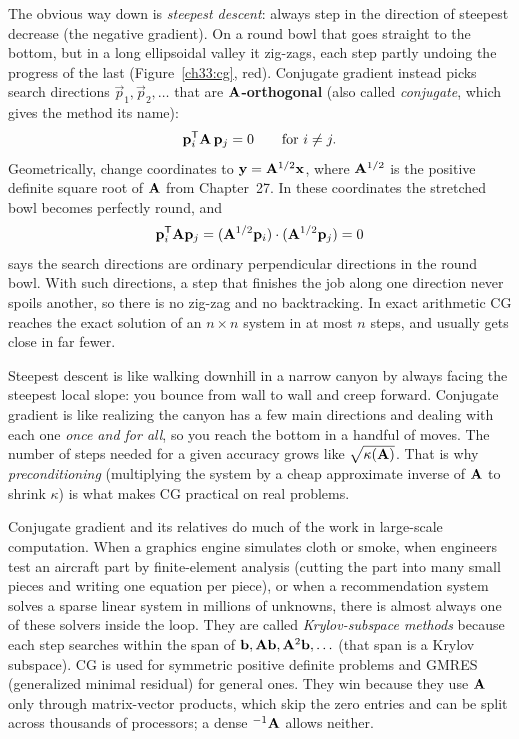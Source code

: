 The obvious way down is \emph{steepest descent}: always step in the direction of
steepest decrease (the negative gradient). On a round bowl that goes straight to the
bottom, but in a long ellipsoidal valley it zig-zags, each step partly undoing the
progress of the last (Figure~\ref{ch33:cg}, red). Conjugate gradient instead picks
search directions $\vec{p}_1,\vec{p}_2,\ldots$ that are \textbf{$\mathbf{A}$-orthogonal}
(also called \emph{conjugate}, which gives the method its name):
\[
  \mathbf{p}_i^{\mathsf{T}}\mathbf{A}\,\mathbf{p}_j=0 \qquad\text{for } i\ne j.
\]
Geometrically, change coordinates to $\mathbf{y}=\mathbf{A}^{1/2}\mathbf{x}$, where
$\mathbf{A}^{1/2}$ is the positive definite square root of $\mathbf{A}$ from Chapter~27. In
these coordinates the stretched bowl becomes perfectly round, and
\[
  \mathbf{p}_i^{\mathsf{T}}\mathbf{A}\mathbf{p}_j=(\mathbf{A}^{1/2}\mathbf{p}_i)\cdot(\mathbf{A}^{1/2}\mathbf{p}_j)=0
\]
says the search directions are ordinary perpendicular directions in the round bowl.
With such directions, a step that finishes the job along one direction never spoils
another, so there is no zig-zag and no backtracking. In exact arithmetic CG reaches the
exact solution of an $n\times n$ system in at most $n$ steps, and usually gets close in
far fewer.

\begin{intuitionbox}
Steepest descent is like walking downhill in a narrow canyon by always facing the
steepest local slope: you bounce from wall to wall and creep forward. Conjugate gradient
is like realizing the canyon has a few main directions and dealing with each one
\emph{once and for all}, so you reach the bottom in a handful of moves. The number of
steps needed for a given accuracy grows like $\sqrt{\kappa(\mathbf{A})}$. That is why
\emph{preconditioning} (multiplying the system by a cheap approximate inverse of
$\mathbf{A}$ to shrink $\kappa$) is what makes CG practical on real problems.
\end{intuitionbox}

\begin{applicationbox}
Conjugate gradient and its relatives do much of the work in large-scale computation.
When a graphics engine simulates cloth or smoke, when engineers test an aircraft part by
finite-element analysis (cutting the part into many small pieces and writing one
equation per piece), or when a recommendation system solves a sparse linear system in
millions of unknowns, there is almost always one of these solvers inside the loop. They
are called \emph{Krylov-subspace methods} because each step searches within the span of
$\mathbf{b}, \mathbf{A}\mathbf{b}, \mathbf{A}^2\mathbf{b}, \ldots$ (that span is a Krylov subspace). CG
is used for symmetric positive definite problems and GMRES (generalized minimal residual)
for general ones. They win because they use $\mathbf{A}$ only through matrix-vector
products, which skip the zero entries and can be split across thousands of processors;
a dense $^{-1}{\mathbf{A}}$ allows neither.
\end{applicationbox}

